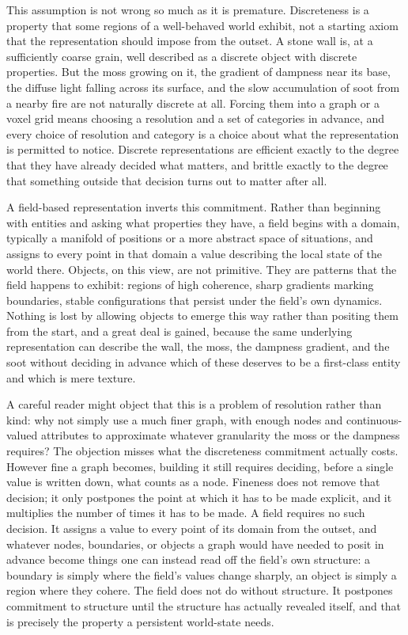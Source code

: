 This assumption is not wrong so much as it is premature. Discreteness is a property that some regions of a well-behaved world exhibit, not a starting axiom that the representation should impose from the outset. A stone wall is, at a sufficiently coarse grain, well described as a discrete object with discrete properties. But the moss growing on it, the gradient of dampness near its base, the diffuse light falling across its surface, and the slow accumulation of soot from a nearby fire are not naturally discrete at all. Forcing them into a graph or a voxel grid means choosing a resolution and a set of categories in advance, and every choice of resolution and category is a choice about what the representation is permitted to notice. Discrete representations are efficient exactly to the degree that they have already decided what matters, and brittle exactly to the degree that something outside that decision turns out to matter after all.

A field-based representation inverts this commitment. Rather than beginning with entities and asking what properties they have, a field begins with a domain, typically a manifold of positions or a more abstract space of situations, and assigns to every point in that domain a value describing the local state of the world there. Objects, on this view, are not primitive. They are patterns that the field happens to exhibit: regions of high coherence, sharp gradients marking boundaries, stable configurations that persist under the field's own dynamics. Nothing is lost by allowing objects to emerge this way rather than positing them from the start, and a great deal is gained, because the same underlying representation can describe the wall, the moss, the dampness gradient, and the soot without deciding in advance which of these deserves to be a first-class entity and which is mere texture.

A careful reader might object that this is a problem of resolution rather than kind: why not simply use a much finer graph, with enough nodes and continuous-valued attributes to approximate whatever granularity the moss or the dampness requires? The objection misses what the discreteness commitment actually costs. However fine a graph becomes, building it still requires deciding, before a single value is written down, what counts as a node. Fineness does not remove that decision; it only postpones the point at which it has to be made explicit, and it multiplies the number of times it has to be made. A field requires no such decision. It assigns a value to every point of its domain from the outset, and whatever nodes, boundaries, or objects a graph would have needed to posit in advance become things one can instead read off the field's own structure: a boundary is simply where the field's values change sharply, an object is simply a region where they cohere. The field does not do without structure. It postpones commitment to structure until the structure has actually revealed itself, and that is precisely the property a persistent world-state needs.

